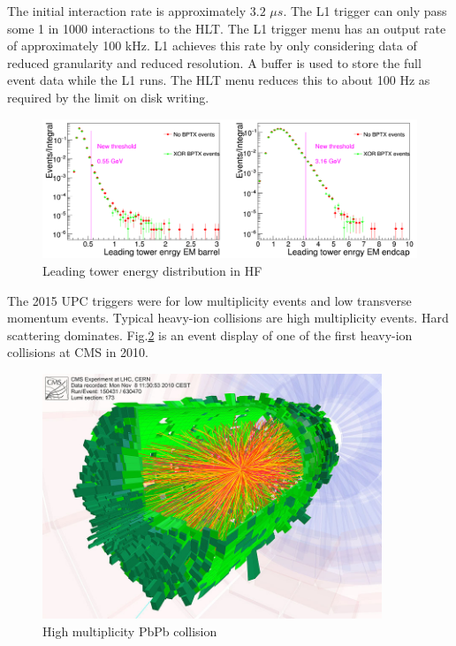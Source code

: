 The initial interaction rate is approximately $3.2$ $\mu s$. The L1 trigger can only pass some 1 in 1000 interactions to the HLT. The L1 trigger menu has an output rate of approximately 100 kHz. L1 achieves this rate by only considering data of reduced granularity and reduced resolution. A buffer is used to store the full event data while the L1 runs. The HLT menu reduces this to about 100 Hz as required by the limit on disk writing.

\begin{figure}[h!]
\begin{centering}
\includegraphics[width=6in]{Chapter5/importfigs/hf_max_tower.png}
\par\end{centering}
\caption{Leading tower energy distribution in HF \label{fig:hfMaxTower}}
\end{figure}

The 2015 UPC triggers were for low multiplicity events and low transverse momentum events. Typical heavy-ion collisions are high multiplicity events. Hard scattering dominates. Fig.\ref{fig:eventdisplayHI} is an event display of one of the first heavy-ion collisions at CMS in 2010.

\begin{figure}[h!]
\begin{centering}
\includegraphics[width=4in]{Chapter3/importfigs/cms_firstleadcoll.jpg}
\par\end{centering}
\caption{High multiplicity PbPb collision \label{fig:eventdisplayHI}}
\end{figure}

